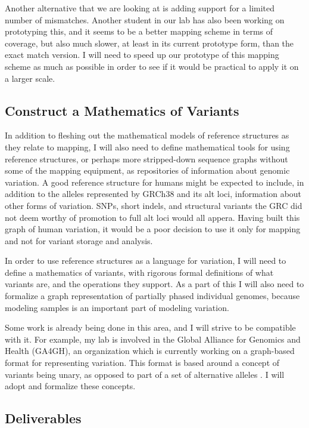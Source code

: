 \documentclass[11pt,proposal]{ucthesis}
\begin{document}
Another alternative that we are looking at is adding support for a limited number of mismatches. Another student in our lab has also been working on prototyping this, and it seems to be a better mapping scheme in terms of coverage, but also much slower, at least in its current prototype form, than the exact match version. I will need to speed up our prototype of this mapping scheme as much as possible in order to see if it would be practical to apply it on a larger scale.

\subsection{Construct a Mathematics of Variants}
\label{subsec:aim1math}

In addition to fleshing out the mathematical models of reference structures as they relate to mapping, I will also need to define mathematical tools for using reference structures, or perhaps more stripped-down sequence graphs without some of the mapping equipment, as repositories of information about genomic variation. A good reference structure for humans might be expected to include, in addition to the alleles represented by GRCh38 and its alt loci, information about other forms of variation. SNPs, short indels, and structural variants the GRC did not deem worthy of promotion to full alt loci would all appera. Having built this graph of human variation, it would be a poor decision to use it only for mapping and not for variant storage and analysis.

In order to use reference structures as a language for variation, I will need to define a mathematics of variants, with rigorous formal definitions of what variants are, and the operations they support. As a part of this I will also need to formalize a graph representation of partially phased individual genomes, because modeling samples is an important part of modeling variation.

Some work is already being done in this area, and I will strive to be compatible with it. For example, my lab is involved in the Global Alliance for Genomics and Health (GA4GH), an organization which is currently working on a graph-based format for representing variation. This format is based around a concept of variants being unary, as opposed to part of a set of alternative alleles \cite{ga4gh2014variation}. I will adopt and formalize these concepts.

\subsection{Deliverables}
\label{subsec:aim1deliverables}
\end{document}
